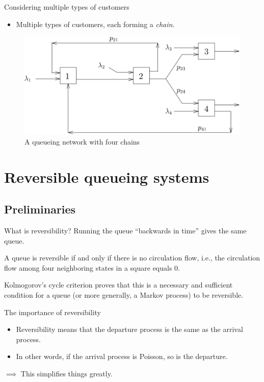 \documentclass[serif, xcolor={svgnames, table}, usepdftitle=false]{beamer}
\begin{document}
\begin{frame}{Considering multiple types of customers}
  \begin{itemize}
  \item Multiple types of customers, each forming a \emph{chain}.
  \end{itemize}
  \begin{figure}[!h]
    \centering
    \includegraphics[width=\linewidth]{Chains.png}
    \caption{A queueing network with four chains}
  \end{figure}
\end{frame}

\section{Reversible queueing systems}

\subsection{Preliminaries}

\begin{frame}{What is reversibility?}
  Running the queue ``backwards in time'' gives the same queue.

  \begin{definition}[Reversibility]
    A queue is reversible if and only if there is no circulation flow, i.e., the
    circulation flow among four neighboring states in a square equals $0$.
  \end{definition}

  Kolmogorov's cycle criterion proves that this is a necessary and sufficient
  condition for a queue (or more generally, a Markov process) to be reversible.
\end{frame}

\begin{frame}{The importance of reversibility}
  \begin{itemize}
  \item Reversibility means that the departure process is the same as the
    arrival process.
  \item In other words, if the arrival process is Poisson, so is the departure.
  \end{itemize}
  $\implies$ This simplifies things greatly.
\end{frame}
\end{document}
